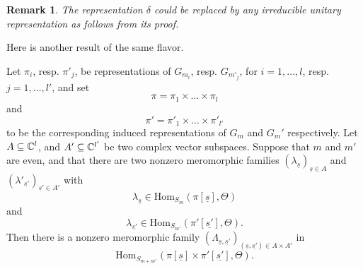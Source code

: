 \documentclass[11pt,letterpaper]{amsart}
\newcommand{\Hom}{\mathrm{Hom}}
\theoremstyle{plain}
\newtheorem {rem}[thm]{Remark} \newtheorem{ex}[thm]{Example}
\numberwithin{equation}{section}
\begin{document}
\begin{rem}\label{rem unitary}
The representation $\delta$ could be replaced by any irreducible unitary representation as follows from its proof.
\end{rem}

Here is another result of the same flavor.

\begin{prop}\label{prop mero shal 2}
Let $\pi_i$, resp. $\pi'_j$, be representations of $G_{m_i}$, resp. $G_{m'_j}$, for $i=1,\dots,l$, resp. $j=1,\dots,l'$, and set 
\[\pi=\pi_1 \times \dots \times \pi_l\] and \[\pi'=\pi'_1 \times \dots \times \pi'_{l'}\] to be the corresponding induced representations of $G_m$ and $G_m'$ respectively. Let $A\subseteq {\mathbb {C}}^{l}$, and $A'\subseteq {\mathbb {C}}^{l'}$ be two complex vector subspaces. Suppose that $m$ and $m'$ are even, and that there are two nonzero meromorphic families $(\lambda_{\underline{s}})_{\underline{s}\in A}$ and $(\lambda'_{\underline{s'}})_{\underline{s'}\in A'}$ with \[\lambda_{\underline{s}}\in \Hom_{S_{m}}(\pi[\underline{s}],\Theta)\] and \[\lambda_{\underline{s'}}\in \Hom_{S_{m'}}(\pi'[\underline{s'}],\Theta).\] Then there is a nonzero meromorphic family 
$(\Lambda_{\underline{s},\underline{s'}})_{(\underline{s},\underline{s'})\in A\times A'}$ in \[\Hom_{S_{m+m'}}(\pi[\underline{s}]\times \pi'[\underline{s'}],\Theta).\]
\end{prop}
\end{document}
